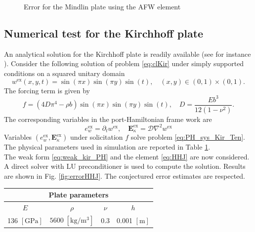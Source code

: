 \documentclass{ifacconf}
\begin{document}
\begin{figure}[ht]
	\caption[errorAFW]{Error for the Mindlin plate using the AFW element}%
	\label{fig:errorAFW}%
\end{figure}

 
\subsection{Numerical test for the Kirchhoff plate}
An analytical solution for the Kirchhoff plate is readily available (see for instance \cite{reddy2006theory}). Consider the following solution of problem \eqref{eq:clKir} under simply supported conditions on a squared unitary domain
\[
w^{\text{ex}}(x,y,t) = \sin(\pi x) \sin(\pi y) \sin(t), \quad  (x, y) \in (0,1)\times (0,1).
\] 
The forcing term is given by  
\[
f = (4 D \pi^4 - \rho b) \sin(\pi x) \sin(\pi y) \sin(t), \quad D = \frac{E b^3}{12 (1-\nu^2)}.
\]
The corresponding variables in the port-Hamiltonian frame work are
\[
e_w^{\text{ex}} = \partial_t w^{\text{ex}}, \quad \bm{E}_\kappa^{\text{ex}} = \mathcal{D} \nabla^2 w^{\text{ex}}
\]
Variables $(e_w^{\text{ex}}, \bm{E}_\kappa^{\text{ex}})$ under solicitation $f$ solve problem \eqref{eq:PH_sys_Kir_Ten}. The physical parameters used in simulation are reported in Table \ref{tab:parKir}. \\
The weak form \eqref{eq:weak_kir_PH} and the element \eqref{eq:HHJ} are now considered.
A direct solver with LU preconditioner is used to compute the solution. Results are shown in Fig. \ref{fig:errorHHJ}. The conjectured error estimates are respected.


\begin{table}[h]
	\centering
	\begin{tabular}{cccc}
		\hline 
		\multicolumn{4}{c}{Plate parameters} \\ 
		\hline 
		$E$ & $\rho$ & $\nu$  & $h$ \\
		136 $[\textrm{GPa}]$ & $5600\; [\textrm{kg}/\textrm{m}^3]$ & 0.3 &  0.001 $[\textrm{m}]$\\ 
		\hline 
	\end{tabular} 
	\captionsetup{width=0.95\linewidth}
	\vspace{1mm}
	\label{tab:parKir}
\end{table}
\end{document}
